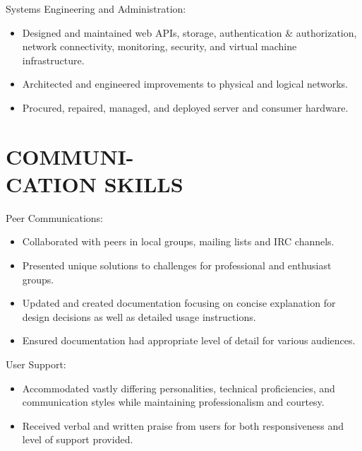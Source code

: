 \documentclass[line,margin]{res}
\begin{document}
\begin{resume}
    Systems Engineering and Administration:
    \vspace{1 mm}
    \begin{itemize}
        \item Designed and maintained web APIs, storage, authentication \&
            authorization, network connectivity, monitoring, security, and
            virtual machine infrastructure.
        \item Architected and engineered improvements to physical and
            logical networks.
        \item Procured, repaired, managed, and deployed server and
            consumer hardware.
    \end{itemize}

\section{COMMUNI- \\ CATION SKILLS}

    Peer Communications:
    \vspace{1 mm}
    \begin{itemize}
        \item Collaborated with peers in local groups, mailing lists and
        IRC channels.
        \item Presented unique solutions to challenges for professional
        and enthusiast groups.
        \item Updated and created documentation focusing on concise
        explanation for design decisions as well as detailed usage
        instructions.
        \item Ensured documentation had appropriate level of detail for
        various audiences.
    \end{itemize}

    User Support:
    \vspace{1 mm}
    \begin{itemize}
        \item Accommodated vastly differing personalities, technical
        proficiencies, and communication styles while maintaining
        professionalism and courtesy.
        \item Received verbal and written praise from users for both
        responsiveness and level of support provided.
    \end{itemize}








\end{resume}
\end{document}
